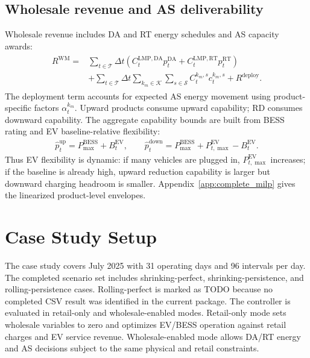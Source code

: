 \documentclass[final,5p,times]{elsarticle}
\newcommand{\DeltaT}{\Delta t}
\newcommand{\EV}{\mathrm{EV}}
\newcommand{\BESS}{\mathrm{BESS}}
\newcommand{\DA}{\mathrm{DA}}
\newcommand{\RT}{\mathrm{RT}}
\newcommand{\WM}{\mathrm{WM}}
\newcommand{\up}{\mathrm{up}}
\newcommand{\down}{\mathrm{down}}
\newcommand{\calT}{\mathcal{T}}
\newcommand{\calK}{\mathcal{K}}
\newcommand{\calS}{\mathcal{S}}
\begin{document}
\subsection{Wholesale revenue and AS deliverability}

Wholesale revenue includes DA and RT energy schedules and AS capacity awards:
\begin{align}
\begin{split}
R^{\WM}={}&\sum_{t\in\calT}\DeltaT\left(C_t^{\mathrm{LMP},\DA}p_t^{\DA}
+C_t^{\mathrm{LMP},\RT}p_t^{\RT}\right)\\
&+\sum_{t\in\calT}\DeltaT\sum_{k_m\in\calK}\sum_{s\in\calS}C_t^{k_m,s}c_t^{k_m,s}
+R^{\mathrm{deploy}}.
\end{split}
\label{eq:wm_revenue_main}
\end{align}
The deployment term accounts for expected AS energy movement using product-specific factors $\alpha_t^{k_m}$. Upward products consume upward capability; RD consumes downward capability. The aggregate capability bounds are built from BESS rating and EV baseline-relative flexibility:
\begin{align}
\hat p_t^{\up}=P_{\max}^{\BESS}+B_t^{\EV},\qquad
\hat p_t^{\down}=P_{\max}^{\BESS}+P_{t,\max}^{\EV}-B_t^{\EV}.
\label{eq:capability_main}
\end{align}
Thus EV flexibility is dynamic: if many vehicles are plugged in, $P_{t,\max}^{\EV}$ increases; if the baseline is already high, upward reduction capability is larger but downward charging headroom is smaller. Appendix~\ref{app:complete_milp} gives the linearized product-level envelopes.

\section{Case Study Setup}
\label{sec:case_study}

The case study covers July 2025 with 31 operating days and 96 intervals per day. The completed scenario set includes shrinking-perfect, shrinking-persistence, and rolling-persistence cases. Rolling-perfect is marked as TODO because no completed CSV result was identified in the current package. The controller is evaluated in retail-only and wholesale-enabled modes. Retail-only mode sets wholesale variables to zero and optimizes EV/BESS operation against retail charges and EV service revenue. Wholesale-enabled mode allows DA/RT energy and AS decisions subject to the same physical and retail constraints.
\end{document}
